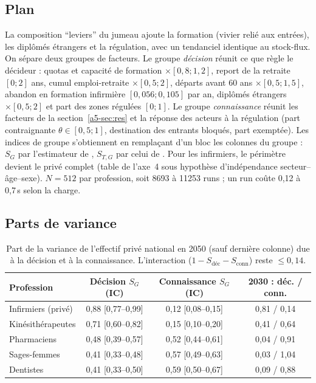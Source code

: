 \subsection{Plan}
La composition \enquote{leviers} du jumeau ajoute la formation (vivier relié aux entrées), les diplômés étrangers et la
régulation, avec un tendanciel identique au stock-flux. On sépare deux groupes de facteurs. Le groupe
\emph{décision} réunit ce que règle le décideur : quotas et capacité de formation $\times[0{,}8 ; 1{,}2]$, report de
la retraite $[0 ; 2]$ ans, cumul emploi-retraite $\times[0{,}5 ; 2]$, départs avant 60 ans $\times[0{,}5 ; 1{,}5]$,
abandon en formation infirmière $[0{,}056 ; 0{,}105]$ par an\derive{}, diplômés étrangers $\times[0{,}5 ; 2]$ et part
des zones régulées $[0 ; 1]$. Le groupe \emph{connaissance} réunit les facteurs de la section~\ref{a5-sec:res} et la
réponse des acteurs à la régulation (part contraignante $\theta \in [0{,}5 ; 1]$\suppose{}, destination des entrants
bloqués, part exemptée). Les indices de groupe s'obtiennent en remplaçant d'un bloc les colonnes du groupe :
$S_G$ par l'estimateur de \citet{a5-saltelli2010}, $S_{T,G}$ par celui de \citet{a5-jansen1999}. Pour les infirmiers, le
périmètre devient le privé complet (table de l'axe~4 sous hypothèse d'indépendance secteur--âge--sexe). $N = 512$
par profession, soit \num{8693} à \num{11253}\mesure{} runs ; un run coûte 0,12 à 0,7\,s\mesure{} selon la charge.

\subsection{Parts de variance}
\begin{table}[h]\centering\small
\begin{tabular}{lccc}
\toprule
Profession & Décision $S_G$ (IC) & Connaissance $S_G$ (IC) & 2030 : déc. / conn. \\
\midrule
Infirmiers (privé) & 0,88\mesure{} [0,77--0,99] & 0,12\mesure{} [0,08--0,15] & 0,81 / 0,14\mesure{} \\
Kinésithérapeutes & 0,71\mesure{} [0,60--0,82] & 0,15\mesure{} [0,10--0,20] & 0,41 / 0,64\mesure{} \\
Pharmaciens & 0,48\mesure{} [0,39--0,57] & 0,52\mesure{} [0,44--0,61] & 0,04 / 0,91\mesure{} \\
Sages-femmes & 0,41\mesure{} [0,33--0,48] & 0,57\mesure{} [0,49--0,63] & 0,03 / 1,04\mesure{} \\
Dentistes & 0,41\mesure{} [0,33--0,50] & 0,59\mesure{} [0,50--0,67] & 0,09 / 0,88\mesure{} \\
\bottomrule
\end{tabular}
\caption{Part de la variance de l'effectif privé national en 2050 (sauf dernière colonne) due à la décision et à la
connaissance. L'interaction ($1 - S_{\text{déc}} - S_{\text{conn}}$) reste $\le 0{,}14$\mesure{}.}\label{a5-tab:groupes}
\end{table}

